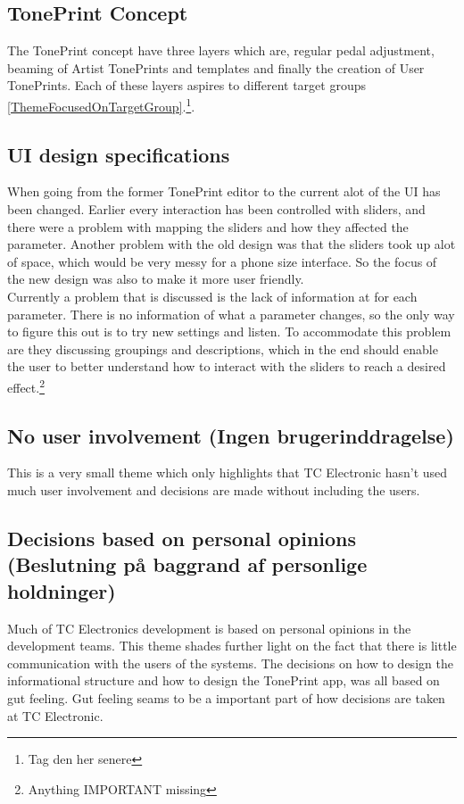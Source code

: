 \subsection*{TonePrint Concept}
\label{ThemeTonePrintConcept}
The TonePrint concept have three layers which are, regular pedal adjustment, beaming of Artist TonePrints and templates and finally the creation of User TonePrints. Each of these layers aspires to different target groups \autoref{ThemeFocusedOnTargetGroup}.\footnote{Tag den her senere}.

\subsection*{UI design specifications}
\label{ThemeParameterUI}
When going from the former TonePrint editor to the current alot of the UI has been changed. Earlier every interaction has been controlled with sliders, and there were a problem with mapping the sliders and how they affected the parameter. Another problem with the old design was that the sliders took up alot of space, which would be very messy for a phone size interface. So the focus of the new design was also to make it more user friendly.\\
Currently a problem that is discussed is the lack of information at for each parameter. There is no information of what a parameter changes, so the only way to figure this out is to try new settings and listen. To accommodate this problem are they discussing groupings and descriptions, which in the end should enable the user to better understand how to interact with the sliders to reach a desired effect.\footnote{Anything IMPORTANT missing}

\subsection*{No user involvement (Ingen brugerinddragelse)} 
\label{ThemeNoUserInvolvement}
This is a very small theme which only highlights that TC Electronic hasn't used much user involvement and decisions are made without including the users. 

\subsection*{Decisions based on personal opinions (Beslutning på baggrand af personlige holdninger)} 
\label{ThemeDecisionsBasedOnPersonalOrpinion}
Much of TC Electronics development is based on personal opinions in the development teams. This theme shades further light on the fact that there is little communication with the users of the systems. The decisions on how to design the informational structure and how to design the TonePrint app, was all based on gut feeling. Gut feeling seams to be a important part of how decisions are taken at TC Electronic.

